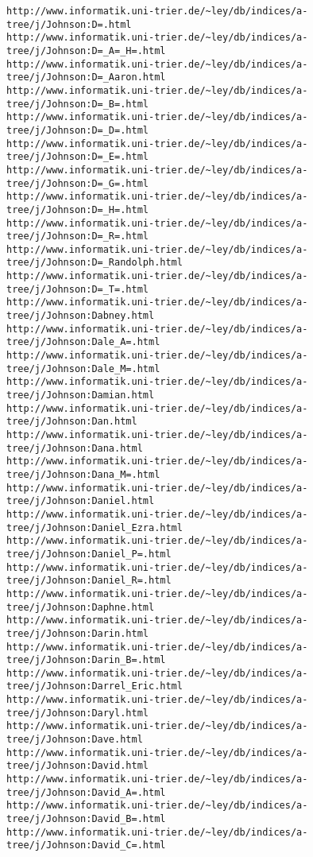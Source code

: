\begin{verbatim}
http://www.informatik.uni-trier.de/~ley/db/indices/a-tree/j/Johnson:D=.html
http://www.informatik.uni-trier.de/~ley/db/indices/a-tree/j/Johnson:D=_A=_H=.html
http://www.informatik.uni-trier.de/~ley/db/indices/a-tree/j/Johnson:D=_Aaron.html
http://www.informatik.uni-trier.de/~ley/db/indices/a-tree/j/Johnson:D=_B=.html
http://www.informatik.uni-trier.de/~ley/db/indices/a-tree/j/Johnson:D=_D=.html
http://www.informatik.uni-trier.de/~ley/db/indices/a-tree/j/Johnson:D=_E=.html
http://www.informatik.uni-trier.de/~ley/db/indices/a-tree/j/Johnson:D=_G=.html
http://www.informatik.uni-trier.de/~ley/db/indices/a-tree/j/Johnson:D=_H=.html
http://www.informatik.uni-trier.de/~ley/db/indices/a-tree/j/Johnson:D=_R=.html
http://www.informatik.uni-trier.de/~ley/db/indices/a-tree/j/Johnson:D=_Randolph.html
http://www.informatik.uni-trier.de/~ley/db/indices/a-tree/j/Johnson:D=_T=.html
http://www.informatik.uni-trier.de/~ley/db/indices/a-tree/j/Johnson:Dabney.html
http://www.informatik.uni-trier.de/~ley/db/indices/a-tree/j/Johnson:Dale_A=.html
http://www.informatik.uni-trier.de/~ley/db/indices/a-tree/j/Johnson:Dale_M=.html
http://www.informatik.uni-trier.de/~ley/db/indices/a-tree/j/Johnson:Damian.html
http://www.informatik.uni-trier.de/~ley/db/indices/a-tree/j/Johnson:Dan.html
http://www.informatik.uni-trier.de/~ley/db/indices/a-tree/j/Johnson:Dana.html
http://www.informatik.uni-trier.de/~ley/db/indices/a-tree/j/Johnson:Dana_M=.html
http://www.informatik.uni-trier.de/~ley/db/indices/a-tree/j/Johnson:Daniel.html
http://www.informatik.uni-trier.de/~ley/db/indices/a-tree/j/Johnson:Daniel_Ezra.html
http://www.informatik.uni-trier.de/~ley/db/indices/a-tree/j/Johnson:Daniel_P=.html
http://www.informatik.uni-trier.de/~ley/db/indices/a-tree/j/Johnson:Daniel_R=.html
http://www.informatik.uni-trier.de/~ley/db/indices/a-tree/j/Johnson:Daphne.html
http://www.informatik.uni-trier.de/~ley/db/indices/a-tree/j/Johnson:Darin.html
http://www.informatik.uni-trier.de/~ley/db/indices/a-tree/j/Johnson:Darin_B=.html
http://www.informatik.uni-trier.de/~ley/db/indices/a-tree/j/Johnson:Darrel_Eric.html
http://www.informatik.uni-trier.de/~ley/db/indices/a-tree/j/Johnson:Daryl.html
http://www.informatik.uni-trier.de/~ley/db/indices/a-tree/j/Johnson:Dave.html
http://www.informatik.uni-trier.de/~ley/db/indices/a-tree/j/Johnson:David.html
http://www.informatik.uni-trier.de/~ley/db/indices/a-tree/j/Johnson:David_A=.html
http://www.informatik.uni-trier.de/~ley/db/indices/a-tree/j/Johnson:David_B=.html
http://www.informatik.uni-trier.de/~ley/db/indices/a-tree/j/Johnson:David_C=.html

\end{verbatim}
